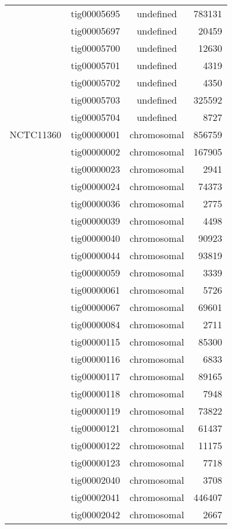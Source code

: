 {\begin{supertabular}{llcr}
          & tig00005695 & undefined & 783131 \\
          & tig00005697 & undefined & 20459 \\
          & tig00005700 & undefined & 12630 \\
          & tig00005701 & undefined & 4319 \\
          & tig00005702 & undefined & 4350 \\
          & tig00005703 & undefined & 325592 \\
          & tig00005704 & undefined & 8727 \\
\hline \hline
NCTC11360 & tig00000001 & chromosomal & 856759 \\
          & tig00000002 & chromosomal & 167905 \\
          & tig00000023 & chromosomal & 2941 \\
          & tig00000024 & chromosomal & 74373 \\
          & tig00000036 & chromosomal & 2775 \\
          & tig00000039 & chromosomal & 4498 \\
          & tig00000040 & chromosomal & 90923 \\
          & tig00000044 & chromosomal & 93819 \\
          & tig00000059 & chromosomal & 3339 \\
          & tig00000061 & chromosomal & 5726 \\
          & tig00000067 & chromosomal & 69601 \\
          & tig00000084 & chromosomal & 2711 \\
          & tig00000115 & chromosomal & 85300 \\
          & tig00000116 & chromosomal & 6833 \\
          & tig00000117 & chromosomal & 89165 \\
          & tig00000118 & chromosomal & 7948 \\
          & tig00000119 & chromosomal & 73822 \\
          & tig00000121 & chromosomal & 61437 \\
          & tig00000122 & chromosomal & 11175 \\
          & tig00000123 & chromosomal & 7718 \\
          & tig00002040 & chromosomal & 3708 \\
          & tig00002041 & chromosomal & 446407 \\
          & tig00002042 & chromosomal & 2667 \\

\end{supertabular}}
